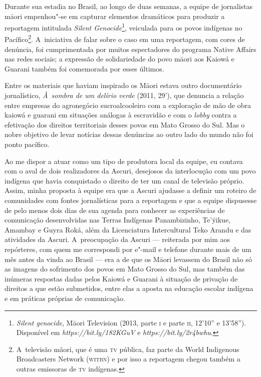 Durante sua estadia no Brasil, ao longo de duas semanas, a equipe de
jornalistas m\=aori empenhou"-se em capturar elementos dramáticos para
produzir a reportagem intitulada \emph{Silent Genocide}\footnote[7]{\emph{Silent
genocide}, M\=aori Television (2013, parte \textsc{i} e parte \textsc{ii},
12'10'' e 13'58''). Disponível em
\emph{https://bit.ly/182KGuV} e \emph{https://bit.ly/2r4bwhu}.},
veiculada para os povos indígenas no Pacífico\footnote[8]{A~televisão
mãori, que é uma \textsc{tv} pública, faz parte da World Indigenous Broadcasters
Network (\textsc{witbn}) e por isso a reportagem chegou também a outras
emissoras de \textsc{tv} indígenas. }. A~iniciativa de falar sobre o caso em uma
reportagem, com cores de denúncia, foi cumprimentada por muitos
espectadores do programa Native Affairs nas redes sociais; a expressão
de solidariedade do povo m\=aori aos Kaiowá e Guarani também foi
comemorada por esses últimos.

Entre os materiais que haviam inspirado os M\=aori estava outro
documentário jornalístico, \emph{À~sombra de um delírio verde} (2011, 29’), que denuncia a relação entre empresas do agronegócio sucroalcooleiro
com a exploração de mão de obra kaiowá e guarani em situações análogas
à escravidão e com o \emph{lobby} contra a efetivação dos direitos
territoriais desses povos em Mato Grosso do Sul. Mas o nobre objetivo
de levar notícias dessas denúncias ao outro lado do mundo não foi ponto
pacífico.

Ao me dispor a atuar como um tipo de produtora local da equipe, eu
contava com o aval de dois realizadores da Ascuri, desejosos da
interlocução com um povo indígena que havia conquistado o direito de
ter um canal de televisão próprio. Assim, minha proposta à equipe era
que a Ascuri ajudasse a definir um roteiro de comunidades com fontes
jornalísticas para a reportagem e que a equipe dispusesse de pelo menos
dois dias de sua agenda para conhecer as experiências de comunicação
desenvolvidas nas Terras Indígenas Panambizinho, Te’ýikue, Amambay e
Guyra Roká, além da Licenciatura Intercultural Teko Arandu e das
atividades da Ascuri. A~preocupação da Ascuri --- reiterada por mim aos
repórteres, com quem me correspondi por e"-mail e telefone durante mais
de um mês antes da vinda ao Brasil --- era a de que os M\=aori levassem
do Brasil não só as imagens do sofrimento dos povos em Mato Grosso do
Sul, mas também das inúmeras respostas dadas pelos Kaiowá e Guarani à
situação de privação de direitos a que estão submetidos, entre elas a
aposta na educação escolar indígena e em práticas próprias de
comunicação. 

